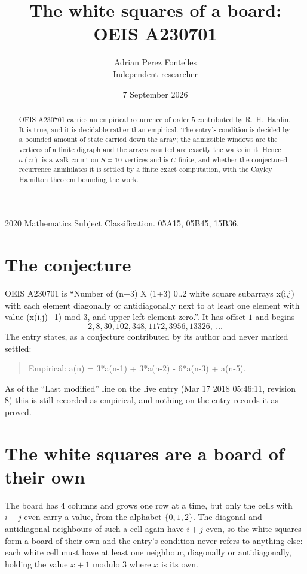 \documentclass[11pt,a4paper]{article}
\title{The white squares of a board: OEIS A230701}
\author{Adrian Perez Fontelles\\ \small Independent researcher}
\date{7 September 2026}
\theoremstyle{plain}
\theoremstyle{definition}
\begin{document}
\maketitle

\begin{abstract}
OEIS A230701 carries an empirical recurrence of order $5$ contributed by R.~H.~Hardin. It is
true, and it is decidable rather than empirical. The entry's condition is decided by a bounded amount of state carried down the array; the
admissible windows are the vertices of a finite digraph and the arrays counted are exactly the
walks in it. Hence $a(n)$ is a walk count on $S=10$ vertices and is $C$-finite, and whether the
conjectured recurrence annihilates it is settled by a finite exact computation, with the
Cayley--Hamilton theorem bounding the work.
\end{abstract}

\noindent\small 2020 Mathematics Subject Classification. 05A15, 05B45, 15B36.\normalsize

\section{The conjecture}

OEIS A230701 is ``Number of (n+3) X (1+3) 0..2 white square subarrays x(i,j) with each element diagonally or antidiagonally next to at least one element with value (x(i,j)+1) mod 3, and upper left element zero.''. It has offset $1$ and begins
\[
2, 8, 30, 102, 348, 1172, 3956, 13326,\ \dots
\]
The entry states, as a conjecture contributed by its author and never marked settled:
\begin{quote}
Empirical: a(n) = 3*a(n-1) + 3*a(n-2) - 6*a(n-3) + a(n-5).
\end{quote}
As of the ``Last modified'' line on the live entry (Mar 17 2018 05:46:11, revision 8) this is still
recorded as empirical, and nothing on the entry records it as proved.

\section{The white squares are a board of their own}

The board has $4$ columns and grows one row at a time, but only the cells with $i+j$ even carry a value, from the alphabet $\{0,1,2\}$. The diagonal and antidiagonal neighbours of such a cell again have $i+j$ even, so the white squares form a board of their own and the entry's condition never refers to anything else: each white cell must have at least one neighbour, diagonally or antidiagonally, holding the value $x+1$ modulo $3$ where $x$ is its own.
\end{document}
